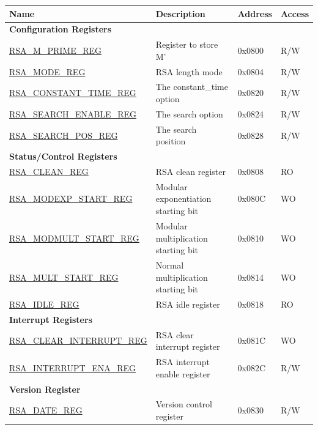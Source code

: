 \begin{longtable}{ | p{5.2cm} | p{6.6cm} | p{2cm} | p{1.2cm} | }
\hline\rowcolor{lightgray}
Name & Description &  Address & Access \\ \hline
\multicolumn{4}{|l|}{\textbf{Configuration Registers}} \\ \hline
\hyperref[regdesc:RSAMPRIMEREG]{RSA\_M\_PRIME\_REG}                 & Register to store M' & 0x0800 & R/W \\ \hline
\hyperref[regdesc:RSAMODEXPMODEREG]{RSA\_MODE\_REG}                     & RSA length mode      & 0x0804 & R/W \\ \hline
\hyperref[regdesc:RSACONSTANTTIMEREG]{RSA\_CONSTANT\_TIME\_REG}     & The constant\_time option & 0x0820 & R/W \\ \hline
\hyperref[regdesc:RSASEARCHENABLEREG]{RSA\_SEARCH\_ENABLE\_REG}     & The search option        & 0x0824 & R/W \\ \hline
\hyperref[regdesc:RSASEARCHPOSREG]{RSA\_SEARCH\_POS\_REG}           & The search position      & 0x0828 & R/W \\ \hline
\multicolumn{4}{|l|}{\textbf{Status/Control Registers}} \\ \hline
\hyperref[regdesc:RSACLEANREG]{RSA\_CLEAN\_REG}                 & RSA clean register               & 0x0808 & RO \\ \hline
\hyperref[regdesc:RSAMODEXPSTARTREG]{RSA\_MODEXP\_START\_REG}   & Modular exponentiation starting bit & 0x080C & WO \\ \hline
\hyperref[regdesc:RSAMODMULTSTARTREG]{RSA\_MODMULT\_START\_REG} & Modular multiplication starting bit & 0x0810 & WO \\ \hline
\hyperref[regdesc:RSAMULTSTARTREG]{RSA\_MULT\_START\_REG}       & Normal multiplication starting bit & 0x0814 & WO \\ \hline
\hyperref[regdesc:RSAIDLEREG]{RSA\_IDLE\_REG}                   & RSA idle register                & 0x0818 & RO \\ \hline
\multicolumn{4}{|l|}{\textbf{Interrupt Registers}} \\ \hline
\hyperref[regdesc:RSACLEARINTERRUPTREG]{RSA\_CLEAR\_INTERRUPT\_REG} & RSA clear interrupt register  & 0x081C & WO  \\ \hline
\hyperref[regdesc:RSAINTERRUPTENAREG]{RSA\_INTERRUPT\_ENA\_REG}     & RSA interrupt enable register & 0x082C & R/W \\ \hline
\multicolumn{4}{|l|}{\textbf{Version Register}} \\ \hline
\hyperref[regdesc:RSADATEREG]{RSA\_DATE\_REG}                   & Version control register     & 0x0830 & R/W \\ \hline
\end{longtable}
